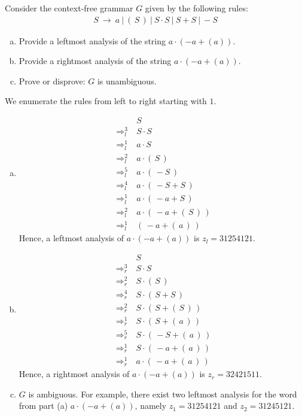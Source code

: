 \begin{exercise}{30}
 Consider the context-free grammar $G$ given by the following rules:
 \begin{align*}
    S  ~\to~ a ~|~ (\,S\,) ~|~ S \cdot S ~|~ S + S ~|~ -S
 \end{align*}
 \begin{enumerate}[(a)]
  \item Provide a leftmost analysis of the string $a \cdot (-a + (a))$.
  \item Provide a rightmost analysis of the string $a \cdot (-a + (a))$.
  \item Prove or disprove: $G$ is unambiguous.
 \end{enumerate}
\end{exercise}

\begin{solution}
 We enumerate the rules from left to right starting with $1$.

\begin{enumerate}[(a)]
 \item
 \begin{align*}
                         & S \\
   ~\Rightarrow_{l}^{3}~ & S \cdot S \\
   ~\Rightarrow_{l}^{1}~ & a \cdot S \\
   ~\Rightarrow_{l}^{2}~ & a \cdot (\,S\,) \\
   ~\Rightarrow_{l}^{5}~ & a \cdot (\,-S\,) \\
   ~\Rightarrow_{l}^{4}~ & a \cdot (\,-S + S\,) \\
   ~\Rightarrow_{l}^{1}~ & a \cdot (\,-a + S\,) \\
   ~\Rightarrow_{l}^{2}~ & a \cdot (\,-a + (\,S\,)\,) \\
   ~\Rightarrow_{l}^{1}~ & (\,-a + (\,a\,)\,)
 \end{align*}
 Hence, a leftmost analysis of $a \cdot (-a + (a))$ is $z_{l} = 31254121$.

 \item
 \begin{align*}
                         & S \\
   ~\Rightarrow_{r}^{3}~ & S \cdot S \\
   ~\Rightarrow_{r}^{2}~ & S \cdot (\,S\,) \\
   ~\Rightarrow_{r}^{4}~ & S \cdot (\,S + S\,) \\
   ~\Rightarrow_{r}^{2}~ & S \cdot (\,S + (\,S\,)\,) \\
   ~\Rightarrow_{r}^{1}~ & S \cdot (\,S + (\,a\,)\,) \\
   ~\Rightarrow_{r}^{5}~ & S \cdot (\,-S + (\,a\,)\,) \\
   ~\Rightarrow_{r}^{1}~ & S \cdot (\,-a + (\,a\,)\,) \\
   ~\Rightarrow_{r}^{1}~ & a \cdot (\,-a + (\,a\,)\,)
 \end{align*}
 Hence, a rightmost analysis of $a \cdot (-a + (a))$ is $z_{r} = 32421511$.

 \item
 $G$ is ambiguous. For example, there exist two leftmost analysis for the word from part (a) $a \cdot (-a + (a))$, namely
 $z_1 = 31254121$ and $z_2 = 31245121$.
\end{enumerate}

\end{solution}
